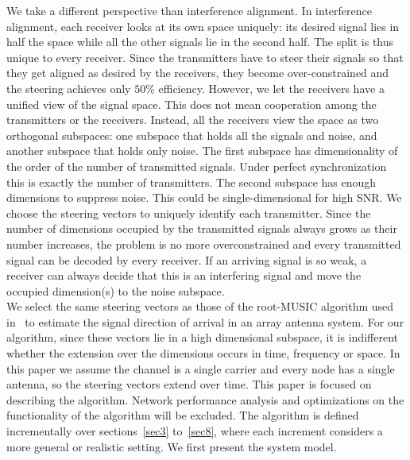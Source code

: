 \documentclass[10pt, a4paper, twocolumn]{IEEEtran}
\begin{document}
\noindent We take a different perspective than interference alignment. In interference alignment, each receiver looks at its own space uniquely: its desired signal lies in half the space while all the other signals lie in the second half. The split is thus unique to every receiver. Since the transmitters have to steer their signals so that they get aligned as desired by the receivers, they become over-constrained and the steering achieves only $50\%$ efficiency. However, we let the receivers have a unified view of the signal space. This does not mean cooperation among the transmitters or the receivers. Instead, all the receivers view the space as two orthogonal subspaces: one subspace that holds all the signals and noise, and another subspace that holds only noise. The first subspace has dimensionality of the order of the number of transmitted signals. Under perfect synchronization this is exactly the number of transmitters. The second subspace has enough dimensions to suppress noise. This could be single-dimensional for high SNR. We choose the steering vectors to uniquely identify each transmitter. Since the number of dimensions occupied by the transmitted signals always grows as their number increases, the problem is no more overconstrained and every transmitted signal can be decoded by every receiver. If an arriving signal is so weak, a receiver can always decide that this is an interfering signal and move the occupied dimension(s) to the noise subspace.\\

\noindent We select the same steering vectors as those of the root-MUSIC algorithm used in~\cite{music} to estimate the signal direction of arrival in an array antenna system. For our algorithm, since these vectors lie in a high dimensional subspace, it is indifferent whether the extension over the dimensions occurs in time, frequency or space. In this paper we assume the channel is a single carrier and every node has a single antenna, so the steering vectors extend over time. This paper is focused on describing the algorithm. Network performance analysis and optimizations on the functionality of the algorithm will be excluded. The algorithm is defined incrementally over sections~\ref{sec3} to~\ref{sec8}, where each increment considers a more general or realistic setting. We first present the system model.
\end{document}
